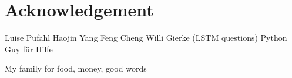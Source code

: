 %
\chapter*{Acknowledgement}
\label{sec:acknowledgement}
\vspace*{-10mm}

Luise Pufahl
Haojin Yang
Feng Cheng
Willi Gierke (LSTM questions)
Python Guy für Hilfe

My family for food, money, good words